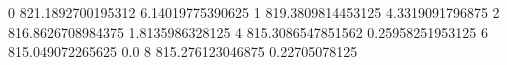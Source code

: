 0 821.1892700195312 6.14019775390625
1 819.3809814453125 4.3319091796875
2 816.8626708984375 1.8135986328125
4 815.3086547851562 0.25958251953125
6 815.049072265625 0.0
8 815.276123046875 0.22705078125
